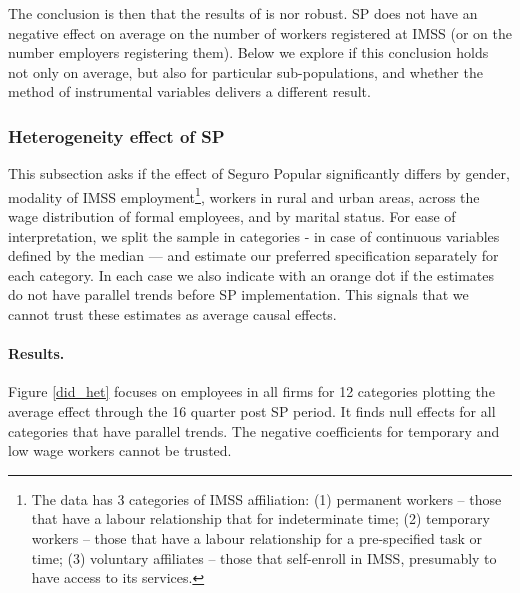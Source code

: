 \documentclass[oneside,11pt]{article}
\begin{document}
\vspace{.1in}

The conclusion is then that the results of \cite{Campos} is nor robust. SP does not have an negative effect on average on the number of workers registered at IMSS (or on the number employers registering them). Below we explore if this conclusion holds not only on average, but also for particular sub-populations, and whether the method of instrumental variables delivers a different result. 


\subsubsection{Heterogeneity effect of SP}

This subsection asks if the effect of Seguro Popular significantly differs by gender, modality of IMSS employment\footnote{The data has 3 categories of IMSS affiliation: (1)  permanent workers -- those that have a labour relationship that for indeterminate time; (2) temporary workers -- those that have a labour relationship for a pre-specified task or time; (3) voluntary affiliates -- those that self-enroll in IMSS, presumably to have access to its services.}, workers in rural and urban areas, across the wage distribution of formal employees, and by marital status. For ease of interpretation, we split the sample in categories - in case of continuous variables defined by the median — and estimate our preferred specification separately for each category. In each case we also indicate with an orange dot if the estimates do not have parallel trends before SP implementation. This signals that we cannot trust these estimates as average causal effects.

\paragraph{Results.} Figure \ref{did_het} focuses on employees in all firms for 12 categories plotting the average effect through the 16 quarter post SP period. It finds null effects for all categories that have parallel trends. The negative coefficients for temporary and low wage workers cannot be trusted.   
\end{document}
